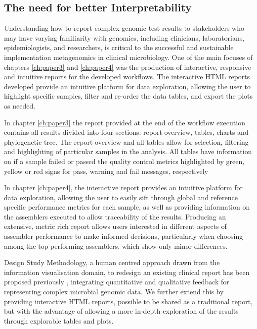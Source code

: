 \subsection{The need for better Interpretability}

Understanding how to report complex genomic test results to stakeholders who may have varying familiarity with genomics, including clinicians, laboratorians, epidemiologists, and researchers, is critical to the successful and sustainable implementation metagenomics in clinical microbiology. One of the main focuses of chapters \ref{ch:paper3} and \ref{ch:paper4} was the production of interactive, responsive and intuitive reports for the developed workflows. The interactive HTML reports developed provide an intuitive platform for data exploration, allowing the user to highlight specific samples, filter and re-order the data tables, and export the plots as needed. 

In chapter \ref{ch:paper3} the report provided at the end of the workflow execution contains all results divided into four sections: report overview, tables, charts and phylogenetic tree. The report overview and all tables allow for selection, filtering and highlighting of particular samples in the analysis. All tables have information on if a sample failed or passed the quality control metrics highlighted by green, yellow or red signs for pass, warning and fail messages, respectively

In chapter \ref{ch:paper4}, the interactive report provides an intuitive platform for data exploration, allowing the user to easily sift through global and reference specific performance metrics for each sample, as well as providing information on the assemblers executed to allow traceability of the results. Producing an extensive, metric rich report allows users interested in different aspects of assembler performance to make informed decisions, particularly when choosing among the top-performing assemblers, which show only minor differences.

Design Study Methodology, a human centred approach drawn from the information visualisation domain, to redesign an existing clinical report has been proposed previously \citep{crisan_evidence-based_2018}, integrating quantitative and qualitative feedback for representing complex microbial genomic data. We further extend this by providing interactive HTML reports, possible to be shared as a traditional report, but with the advantage of allowing a more in-depth exploration of the results through explorable tables and plots. 

